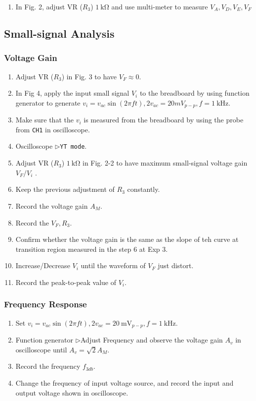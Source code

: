 \documentclass[12pt, a4paper]{article}
\newcommand{\tri}{$\rhd$}
\begin{document}
\begin{enumerate}[itemsep=0pt]
  \item In Fig. 2, adjust VR ($R_3$) $\SI{1}\kohm$ and use multi-meter to measure 
     $V_A , V_D , V_E, V_F$
\end{enumerate}

\subsection{Small-signal Analysis}
\subsubsection{Voltage Gain}
\begin{enumerate}[itemsep=0pt]
  \item Adjust VR ($R_3$) in Fig. 3 to have 
    $V_F \approx 0$.
  \item In Fig 4, apply the input small signal $V_i$ to the breadboard
    by using function generator to generate $v_i = v_{ac} \sin(2\pi f t),
    2v_{ac} = 20mV_{p-p}, f= \SI{1}\kHz$.
  \item Make sure that the $v_i$ is measured from the breadboard by using
    the probe from \texttt{CH1} in oscilloscope.
  \item Oscilloscope \tri \texttt{YT mode}. 
  \item Adjust VR ($R_3$) $\SI{1}\kohm$ in Fig. 2-2 to have maximum small-signal voltage 
     gain $V_F/V_i$ . 
  \item Keep the previous adjustment of $R_3$ constantly. 
  \item Record the voltage gain $A_M$.
  \item Record the $V_F, R_3$.
  \item Confirm whether the voltage gain is the same as the slope of teh
    curve at transition region measured in the step 6 at Exp 3.
  \item Increase/Decrease $V_i$ until the waveform of $V_F$ just distort.
  \item Record the peak-to-peak value of $V_i$.
\end{enumerate}

\subsubsection{Frequency Response}
\begin{enumerate}[itemsep=0pt]
  \item Set $v_i = v_{ac} \sin (2 \pi f t) , 2 v_{ac} = \SI{20}\mV_{p-p}, f = \SI{1}\kHz$.
    \item Function generator \tri Adjust Frequency and observe the voltage gain $A_v$ in 
      oscilloscope until $A_v = \sqrt{2} A_M$.
    \item Record the frequency $f_{3db}$.
    \item Change the frequency of input voltage source, and
      record the input and output voltage shown in oscilloscope.
\end{enumerate}
\end{document}
